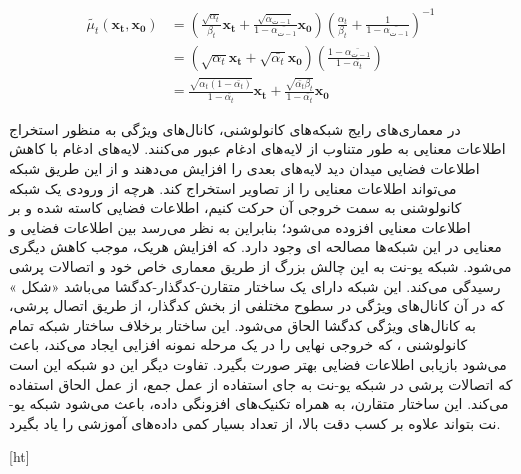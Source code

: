 \begin{equation}
	\begin{aligned}
		\tilde{\mu_t}(\mathbf{x_t}, \mathbf{x_0}) &= \left( \frac{\sqrt{\alpha_t}}{\beta_t} \mathbf{x_t} + \frac{\sqrt{\bar{\alpha_{ت-1}}}}{1 - \bar{\alpha_{ت-1}}} \mathbf{x_0} \right) \left( \frac{\alpha_t}{\beta_t} + \frac{1}{1 - \bar{\alpha_{ت-1}}} \right)^{-1} \\
		&= \left( \sqrt{\alpha_t} \mathbf{x_t} + \sqrt{\bar{\alpha_t}} \mathbf{x_0} \right) \left( \frac{1 - \bar{\alpha_{ت-1}}}{1 - \bar{\alpha_t}} \right) \\
		&= \frac{\sqrt{\alpha_t (1 - \bar{\alpha_t})}}{1 - \bar{\alpha_t}} \mathbf{x_t} + \frac{\sqrt{\bar{\alpha_t} \beta_t}}{1 - \bar{\alpha_t}} \mathbf{x_0}
	\end{aligned}
\end{equation}





در معماری‌های رایج شبکه‌های کانولوشنی، کانال‌های ویژگی به منظور استخراج اطلاعات معنایی به طور متناوب از لایه‌های ادغام عبور می‌کنند. لایه‌های ادغام با کاهش اطلاعات فضایی میدان دید لایه‌های بعدی را افزایش می‌دهند و از این طریق شبکه می‌تواند اطلاعات معنایی را از تصاویر استخراج کند. هرچه از ورودی یک شبکه کانولوشنی به سمت خروجی آن حرکت کنیم، اطلاعات فضایی کاسته شده و بر اطلاعات معنایی افزوده می‌شود؛ بنابراین به نظر می‌رسد بین اطلاعات فضایی و معنایی در این شبکه‌ها مصالحه ای وجود دارد. که افزایش هریک، موجب کاهش دیگری می‌شود. شبکه یو-نت به این چالش بزرگ از طریق معماری خاص خود و اتصالات پرشی رسیدگی می‌کند. این شبکه دارای یک ساختار متقارن-کدگذار-کدگشا می‌باشد «شکل » که در آن کانال‌های ویژگی در سطوح مختلفی از بخش کدگذار، از طریق اتصال پرشی، به کانال‌های ویژگی کدگشا الحاق می‌شود. این ساختار برخلاف ساختار شبکه تمام کانولوشنی ، که خروجی نهایی را در یک مرحله نمونه افزایی ایجاد می‌کند، باعث می‌شود بازیابی اطلاعات فضایی بهتر صورت بگیرد. تفاوت دیگر این دو شبکه این است که اتصالات پرشی در شبکه یو-نت به جای استفاده از عمل جمع، از عمل الحاق استفاده می‌کند. این ساختار متقارن، به همراه تکنیک‌های افزونگی داده، باعث می‌شود شبکه یو-نت بتواند علاوه بر کسب دقت بالا، از تعداد بسیار کمی داده‌های آموزشی را یاد بگیرد.


[ht]


